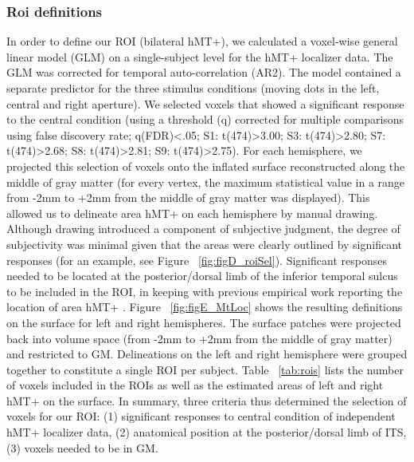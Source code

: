 \subsubsection{Roi definitions}
In order to define our ROI (bilateral hMT+), we calculated a voxel-wise general linear model (GLM) on a single-subject level for the hMT+ localizer data. The GLM was corrected for temporal auto-correlation (AR2). The model contained a separate predictor for the three stimulus conditions (moving dots in the left, central and right aperture). We selected voxels that showed a significant response to the central condition (using a threshold (q) corrected for multiple comparisons using false discovery rate; q(FDR)\textless.05; S1: t(474)\textgreater3.00; S3: t(474)\textgreater2.80; S7: t(474)\textgreater2.68; S8: t(474)\textgreater2.81; S9: t(474)\textgreater2.75). For each hemisphere, we projected this selection of voxels onto the inflated surface reconstructed along the middle of gray matter (for every vertex, the maximum statistical value in a range from -2mm to +2mm from the middle of gray matter was displayed). This allowed us to delineate area hMT+ on each hemisphere by manual drawing. Although drawing introduced a component of subjective judgment, the degree of subjectivity was minimal given that the areas were clearly outlined by significant responses (for an example, see Figure ~\ref{fig:figD_roiSel}). Significant responses needed to be located at the posterior/dorsal limb of the inferior temporal sulcus to be included in the ROI, in keeping with previous empirical work reporting the location of area hMT+ \parencite{Dumoulin2000, Huk2002, Kolster2010}. Figure ~\ref{fig:figE_MtLoc} shows the resulting definitions on the surface for left and right hemispheres. The surface patches were projected back into volume space (from -2mm to +2mm from the middle of gray matter) and restricted to GM. Delineations on the left and right hemisphere were grouped together to constitute a single ROI per subject. Table ~\ref{tab:rois} lists the number of voxels included in the ROIs as well as the estimated areas of left and right hMT+ on the surface. In summary, three criteria thus determined the selection of voxels for our ROI: (1) significant responses to central condition of independent hMT+ localizer data, (2) anatomical position at the posterior/dorsal limb of ITS, (3) voxels needed to be in GM.

